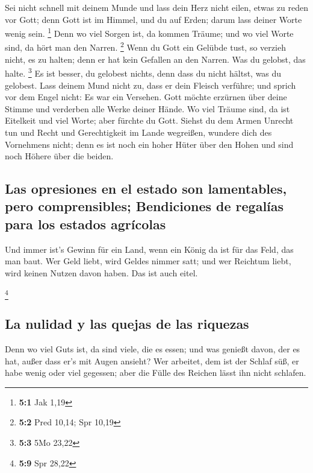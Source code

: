  Sei nicht schnell mit deinem Munde und lass dein Herz
nicht eilen, etwas zu reden vor Gott; denn Gott ist im Himmel, und du
auf Erden; darum lass deiner Worte wenig sein. \footnote{\textbf{5:1}
  Jak 1,19}  Denn wo viel Sorgen ist, da kommen Träume;
und wo viel Worte sind, da hört man den Narren. \footnote{\textbf{5:2}
  Pred 10,14; Spr 10,19}  Wenn du Gott ein Gelübde tust,
so verzieh nicht, es zu halten; denn er hat kein Gefallen an den Narren.
Was du gelobst, das halte. \footnote{\textbf{5:3} 5Mo 23,22}
 Es ist besser, du gelobest nichts, denn dass du nicht
hältst, was du gelobest.  Lass deinem Mund nicht zu, dass
er dein Fleisch verführe; und sprich vor dem Engel nicht: Es war ein
Versehen. Gott möchte erzürnen über deine Stimme und verderben alle
Werke deiner Hände.  Wo viel Träume sind, da ist Eitelkeit
und viel Worte; aber fürchte du Gott.  Siehst du dem Armen
Unrecht tun und Recht und Gerechtigkeit im Lande wegreißen, wundere dich
des Vornehmens nicht; denn es ist noch ein hoher Hüter über den Hohen
und sind noch Höhere über die beiden.

\hypertarget{las-opresiones-en-el-estado-son-lamentables-pero-comprensibles-bendiciones-de-regaluxedas-para-los-estados-agruxedcolas}{%
\subsection{Las opresiones en el estado son lamentables, pero
comprensibles; Bendiciones de regalías para los estados
agrícolas}\label{las-opresiones-en-el-estado-son-lamentables-pero-comprensibles-bendiciones-de-regaluxedas-para-los-estados-agruxedcolas}}

 Und immer ist's Gewinn für ein Land, wenn ein König da
ist für das Feld, das man baut.  Wer Geld liebt, wird
Geldes nimmer satt; und wer Reichtum liebt, wird keinen Nutzen davon
haben. Das ist auch eitel.

\footnote{\textbf{5:9} Spr 28,22}

\hypertarget{la-nulidad-y-las-quejas-de-las-riquezas}{%
\subsection{La nulidad y las quejas de las
riquezas}\label{la-nulidad-y-las-quejas-de-las-riquezas}}

 Denn wo viel Guts ist, da sind viele, die es essen; und
was genießt davon, der es hat, außer dass er's mit Augen ansieht?
 Wer arbeitet, dem ist der Schlaf süß, er habe wenig oder
viel gegessen; aber die Fülle des Reichen lässt ihn nicht schlafen.


